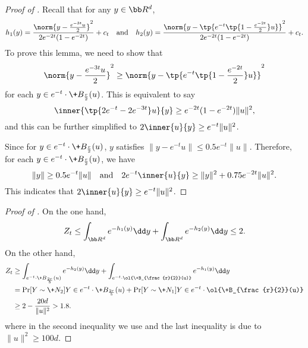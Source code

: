 \begin{proof}[Proof of ]
    Recall that for any $y\in \bb R^d$,
    \[
    h_1(y) = \frac{\norm{y-\frac{e^{-3t}u}{2}}^2}{2e^{-2t}(1-e^{-2t})} + c_t \quad \mbox{and}\quad h_2(y) = \frac{\norm{y- \tp{e^{-t}\tp{1-\frac{e^{-2t}}{2}}u }}^2}{2e^{-2t}(1-e^{-2t})} + c_t.
    \]
    To prove this lemma, we need to show that
    \[
        \norm{y-\frac{e^{-3t}u}{2}}^2 \geq \norm{y- \tp{e^{-t}\tp{1-\frac{e^{-2t}}{2}}u }}^2
    \]
    for each $y\in e^{-t}\cdot \+B_{\frac{r}{2}}(u)$. This is equivalent to say
    \begin{equation*}
        \inner{\tp{2e^{-t} - 2e^{-3t}}u}{y} \geq e^{-2t}(1-e^{-2t}) \|u\|^2,
    \end{equation*}
    and this can be further simplified to $2\inner{u}{y} \geq e^{-t}\|u\|^2$.

    Since for $y\in e^{-t}\cdot \+B_{\frac{r}{2}}(u)$, $y$ satisfies $\| y - e^{-t}u\| \leq 0.5 e^{-t} \|u\|$. Therefore, for each $y\in e^{-t}\cdot\+B_{\frac{r}{2}}(u)$, we have
    \begin{equation*}
        \|y\| \geq 0.5 e^{-t}\|u\| \quad \mbox{and} \quad 2e^{-t}\inner{u}{y} \geq \|y\|^2 + 0.75 e^{-2t} \|u\|^2.
    \end{equation*}
    This indicates that $2\inner{u}{y} \geq e^{-t}\|u\|^2$.
\end{proof}


\begin{proof}[Proof of ]
    On the one hand,
    \begin{align*}
        Z_t \leq \int_{\bb R^d} e^{-h_1(y)} \dd y + \int_{\bb R^d} e^{-h_2(y)} \dd y \leq 2.
    \end{align*}
    On the other hand,
    \begin{align*}
        Z_t &\geq \int_{e^{-t}\cdot \+B_{\frac{2r}{5}}(u)} e^{-h_2(y)} \dd y + \int_{e^{-t}\cdot \ol{\+B_{\frac{r}{2}}(u)}} e^{-h_1(y)} \dd y \\
        & = \Pr[Y\sim \+N_2]{Y\in e^{-t}\cdot \+B_{\frac{2r}{5}}(u)} + \Pr[Y\sim \+N_1]{Y\in e^{-t}\cdot \ol{\+B_{\frac{r}{2}}(u)}}\\
        &\geq 2- \frac{20 d}{\|u\|^2} >1.8.
    \end{align*}
    where in the second inequality we use  and the last inequality is due to $\|u\|^2\geq 100 d$.
\end{proof}

